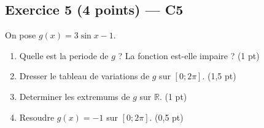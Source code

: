 \subsection*{Exercice 5 \hfill (4 points) — C5}

On pose $g(x) = 3\sin x - 1$.

\begin{enumerate}
  \item Quelle est la periode de $g$ ? La fonction est-elle impaire ? \hfill (1 pt)
  \item Dresser le tableau de variations de $g$ sur $[0;2\pi]$. \hfill (1,5 pt)
  \item Determiner les extremums de $g$ sur $\mathbb{R}$. \hfill (1 pt)
  \item Resoudre $g(x) = -1$ sur $[0;2\pi]$. \hfill (0,5 pt)
\end{enumerate}
